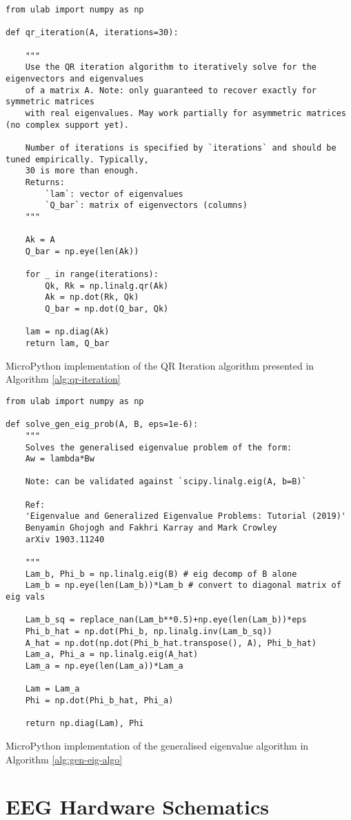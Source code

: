 \begin{listing}[!htb]
\small
\begin{verbatim}
from ulab import numpy as np

def qr_iteration(A, iterations=30):
    
    """
    Use the QR iteration algorithm to iteratively solve for the eigenvectors and eigenvalues
    of a matrix A. Note: only guaranteed to recover exactly for symmetric matrices
    with real eigenvalues. May work partially for asymmetric matrices (no complex support yet).
    
    Number of iterations is specified by `iterations` and should be tuned empirically. Typically,
    30 is more than enough.
    Returns:
        `lam`: vector of eigenvalues
        `Q_bar`: matrix of eigenvectors (columns)
    """

    Ak = A
    Q_bar = np.eye(len(Ak))

    for _ in range(iterations):
        Qk, Rk = np.linalg.qr(Ak)
        Ak = np.dot(Rk, Qk)
        Q_bar = np.dot(Q_bar, Qk)

    lam = np.diag(Ak)
    return lam, Q_bar

\end{verbatim}
\caption{MicroPython implementation of the QR Iteration algorithm presented in Algorithm \ref{alg:qr-iteration}}
\label{app-listing:qr-iteration-mpy}
\end{listing}

\begin{listing}[!htb]
\small
\begin{verbatim}
from ulab import numpy as np

def solve_gen_eig_prob(A, B, eps=1e-6):
    """
    Solves the generalised eigenvalue problem of the form:
    Aw = lambda*Bw
    
    Note: can be validated against `scipy.linalg.eig(A, b=B)`
    
    Ref: 
    'Eigenvalue and Generalized Eigenvalue Problems: Tutorial (2019)'
    Benyamin Ghojogh and Fakhri Karray and Mark Crowley
    arXiv 1903.11240

    """
    Lam_b, Phi_b = np.linalg.eig(B) # eig decomp of B alone
    Lam_b = np.eye(len(Lam_b))*Lam_b # convert to diagonal matrix of eig vals
    
    Lam_b_sq = replace_nan(Lam_b**0.5)+np.eye(len(Lam_b))*eps
    Phi_b_hat = np.dot(Phi_b, np.linalg.inv(Lam_b_sq))
    A_hat = np.dot(np.dot(Phi_b_hat.transpose(), A), Phi_b_hat)
    Lam_a, Phi_a = np.linalg.eig(A_hat)
    Lam_a = np.eye(len(Lam_a))*Lam_a
    
    Lam = Lam_a
    Phi = np.dot(Phi_b_hat, Phi_a)
    
    return np.diag(Lam), Phi

\end{verbatim}
\caption{MicroPython implementation of the generalised eigenvalue algorithm in Algorithm \ref{alg:gen-eig-algo}}
\label{app-listing:gen-eig-prob-mpy}
\end{listing}

\section{EEG Hardware Schematics}

\label{appendix:schematics}
